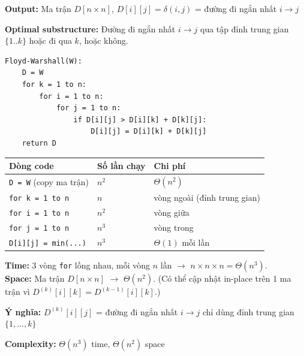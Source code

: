 \documentclass[10pt]{article}
\begin{document}
\textbf{Output:} Ma trận \(D[n \times n]\), \(D[i][j] = \delta(i,j)\) =
đường đi ngắn nhất \(i \to j\)

\textbf{Optimal substructure:} Đường đi ngắn nhất \(i \to j\) qua tập
đỉnh trung gian \(\{1..k\}\) hoặc đi qua \(k\), hoặc không.

\begin{tcolorbox}[colback=gray!8, colframe=gray!50, boxrule=0.5pt, arc=2pt,
  left=6pt, right=6pt, top=4pt, bottom=4pt,
  title={\small\textbf{Pseudocode 19: Floyd-Warshall}}]
\begin{verbatim}
Floyd-Warshall(W):
    D = W
    for k = 1 to n:
        for i = 1 to n:
            for j = 1 to n:
                if D[i][j] > D[i][k] + D[k][j]:
                    D[i][j] = D[i][k] + D[k][j]
    return D
\end{verbatim}
\end{tcolorbox}

\begin{tcolorbox}[colback=yellow!5, colframe=orange!50, boxrule=0.5pt, arc=2pt, title={\small\textbf{Phân tích Complexity -- Floyd-Warshall}}]
\begin{tabular}{|l|l|l|}
\hline
\textbf{Dòng code} & \textbf{Số lần chạy} & \textbf{Chi phí} \\
\hline
\texttt{D = W} (copy ma trận) & $n^2$ & $\Theta(n^2)$ \\
\hline
\texttt{for k = 1 to n} & $n$ & vòng ngoài (đỉnh trung gian) \\
\hline
\quad \texttt{for i = 1 to n} & $n^2$ & vòng giữa \\
\hline
\quad\quad \texttt{for j = 1 to n} & $n^3$ & vòng trong \\
\hline
\quad\quad\quad \texttt{D[i][j] = min(...)} & $n^3$ & $\Theta(1)$ mỗi lần \\
\hline
\end{tabular}
\vspace{0.2cm}

\textbf{Time:} 3 vòng \texttt{for} lồng nhau, mỗi vòng $n$ lần $\to$ $n \times n \times n = \Theta(n^3)$.\\
\textbf{Space:} Ma trận $D[n \times n]$ $\to$ $\Theta(n^2)$. {\small (Có thể cập nhật in-place trên 1 ma trận vì $D^{(k)}[i][k] = D^{(k-1)}[i][k]$.)}
\end{tcolorbox}

\textbf{Ý nghĩa:} \(D^{(k)}[i][j]\) = đường đi ngắn nhất \(i \to j\) chỉ
dùng đỉnh trung gian \(\{1, \ldots, k\}\)

\textbf{Complexity:} \(\Theta(n^3)\) time, \(\Theta(n^2)\) space
\end{document}
